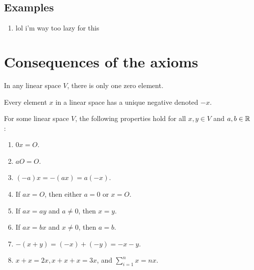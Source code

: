 \documentclass[main.tex]{subfiles}
\begin{document}
    \subsection{Examples}
    \begin{enumerate}
        \item lol i'm way too lazy for this
    \end{enumerate}
    \section{Consequences of the axioms}
    \begin{theorem}
        {In any linear space $V$, there is only one zero element.}    
    \end{theorem}
    \begin{theorem}
        {Every element $x$ in a linear space has a unique negative denoted $-x$.}
    \end{theorem}
    \begin{theorem}
        For some linear space $V$, the following properties hold for all $x,y \in V$ and $a,b \in \mathbb{R}$:
        \begin{enumerate}
            \item $0x = O$.
            \item $aO = O$.
            \item $(-a)x = -(ax) = a(-x)$.
            \item If $ax = O$, then either $a = 0$ or $x = O$.
            \item If $ax = ay$ and $a \neq 0$, then $x = y$.
            \item If $ax = bx$ and $x \neq 0$, then $a = b$.
            \item $-(x+y) = (-x) + (-y) = -x - y$.
            \item $x + x = 2x, x + x + x = 3x$, and $\sum^n_{i=1} x = nx$. 
        \end{enumerate}
    \end{theorem}
    
\end{document}
